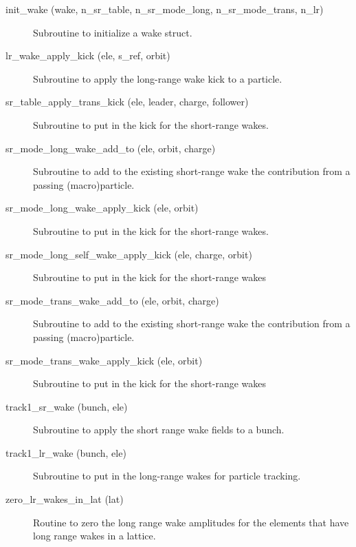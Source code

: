 \begin{description}

\label{r:init.wake}
\item[init_wake (wake, n_sr_table, n_sr_mode_long, n_sr_mode_trans, n_lr)] \Newline 
Subroutine to initialize a wake struct.

\label{r:lr.wake.apply.kick}
\item[lr_wake_apply_kick (ele, s_ref, orbit)] \Newline 
Subroutine to apply the long-range wake kick to a particle.

\label{r:sr.table.apply.trans.kick}
\item[sr_table_apply_trans_kick (ele, leader, charge, follower)] \Newline 
Subroutine to put in the kick for the short-range wakes.

\label{r:sr.mode.long.wake.add.to}
\item[sr_mode_long_wake_add_to (ele, orbit, charge)] \Newline 
Subroutine to add to the existing short-range wake the contribution from
a passing (macro)particle.

\label{r:sr.mode.long.wake.apply.kick}
\item[sr_mode_long_wake_apply_kick (ele, orbit)] \Newline 
Subroutine to put in the kick for the short-range wakes.

\label{r:sr.mode.long.self.wake.apply.kick}
\item[sr_mode_long_self_wake_apply_kick (ele, charge, orbit)] \Newline 
Subroutine to put in the kick for the short-range wakes

\label{r:sr.mode.trans.wake.add.to}
\item[sr_mode_trans_wake_add_to (ele, orbit, charge)] \Newline 
Subroutine to add to the existing short-range wake the contribution from
a passing (macro)particle.

\label{r:sr.mode.trans.wake.apply.kick}
\item[sr_mode_trans_wake_apply_kick (ele, orbit)] \Newline 
Subroutine to put in the kick for the short-range wakes

\label{r:track1.sr.wake}
\item[track1_sr_wake (bunch, ele)] \Newline 
Subroutine to apply the short range wake fields to a bunch. 

\label{r:track1.lr.wake}
\item[track1_lr_wake (bunch, ele)] \Newline 
Subroutine to put in the long-range wakes for particle tracking.

\label{r:zero.lr.wakes.in.lat}
\item[zero_lr_wakes_in_lat (lat)] \Newline 
Routine to zero the long range wake amplitudes for the elements that have
long range wakes in a lattice.

\end{description}

